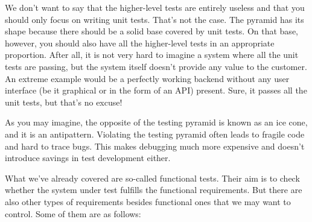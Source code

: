We don't want to say that the higher-level tests are entirely useless and that you should only focus on writing unit tests. That's not the case. The pyramid has its shape because there should be a solid base covered by unit tests. On that base, however, you should also have all the higher-level tests in an appropriate proportion. After all, it is not very hard to imagine a system where all the unit tests are passing, but the system itself doesn't provide any value to the customer. An extreme example would be a perfectly working backend without any user interface (be it graphical or in the form of an API) present. Sure, it passes all the unit tests, but that's no excuse!

As you may imagine, the opposite of the testing pyramid is known as an ice cone, and it is an antipattern. Violating the testing pyramid often leads to fragile code and hard to trace bugs. This makes debugging much more expensive and doesn't introduce savings in test development either.


What we've already covered are so-called functional tests. Their aim is to check whether the system under test fulfills the functional requirements. But there are also other types of requirements besides functional ones that we may want to control. Some of them are as follows:

